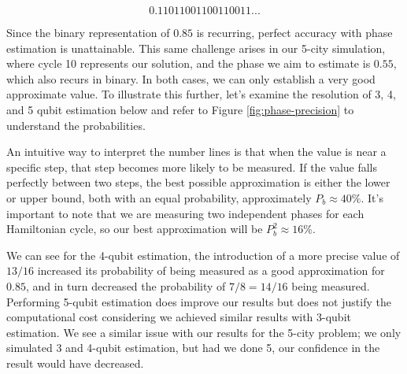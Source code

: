 \documentclass[msc,oneside]{ubcthesis}
\begin{document}
	$$0.11011001100110011...$$
	
Since the binary representation of $0.85$ is recurring, perfect accuracy with phase estimation is unattainable. This same challenge arises in our 5-city simulation, where cycle 10 represents our solution, and the phase we aim to estimate is $0.55$, which also recurs in binary. In both cases, we can only establish a very good approximate value. To illustrate this further, let's examine the resolution of 3, 4, and 5 qubit estimation below and refer to Figure \ref{fig:phase-precision} to understand the probabilities.
	
	
An intuitive way to interpret the number lines is that when the value is near a specific step, that step becomes more likely to be measured. If the value falls perfectly between two steps, the best possible approximation is either the lower or upper bound, both with an equal probability, approximately $P_b \approx 40\%$. It's important to note that we are measuring two independent phases for each Hamiltonian cycle, so our best approximation will be $P_b^2 \approx 16\%$.
	
We can see for the 4-qubit estimation, the introduction of a more precise value of $13/16$ increased its probability of being measured as a good approximation for $0.85$, and in turn decreased the probability of $7/8 = 14/16$ being measured. Performing 5-qubit estimation does improve our results but does not justify the computational cost considering we achieved similar results with 3-qubit estimation. We see a similar issue with our results for the 5-city problem; we only simulated 3 and 4-qubit estimation, but had we done 5, our confidence in the result would have decreased.
	
\end{document}
